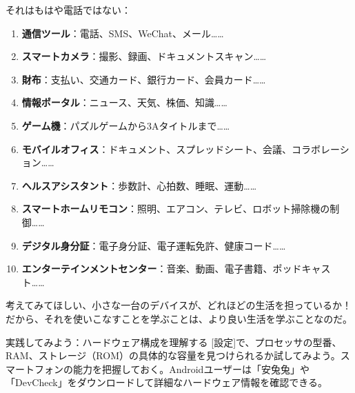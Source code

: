 
それはもはや電話ではない：

\begin{enumerate}
  \item \textbf{通信ツール}：電話、SMS、WeChat、メール……
  \item \textbf{スマートカメラ}：撮影、録画、ドキュメントスキャン……
  \item \textbf{財布}：支払い、交通カード、銀行カード、会員カード……
  \item \textbf{情報ポータル}：ニュース、天気、株価、知識……
  \item \textbf{ゲーム機}：パズルゲームから3Aタイトルまで……
  \item \textbf{モバイルオフィス}：ドキュメント、スプレッドシート、会議、コラボレーション……
  \item \textbf{ヘルスアシスタント}：歩数計、心拍数、睡眠、運動……
  \item \textbf{スマートホームリモコン}：照明、エアコン、テレビ、ロボット掃除機の制御……
  \item \textbf{デジタル身分証}：電子身分証、電子運転免許、健康コード……
  \item \textbf{エンターテインメントセンター}：音楽、動画、電子書籍、ポッドキャスト……
\end{enumerate}

考えてみてほしい、小さな一台のデバイスが、どれほどの生活を担っているか！だから、それを使いこなすことを学ぶことは、より良い生活を学ぶことなのだ。

\begin{tcbpractice}{実践してみよう：ハードウェア構成を理解する}
[設定]で、プロセッサの型番、RAM、ストレージ（ROM）の具体的な容量を見つけられるか試してみよう。スマートフォンの能力を把握しておく。Androidユーザーは「安兔兔」や「DevCheck」をダウンロードして詳細なハードウェア情報を確認できる。

\end{tcbpractice}
